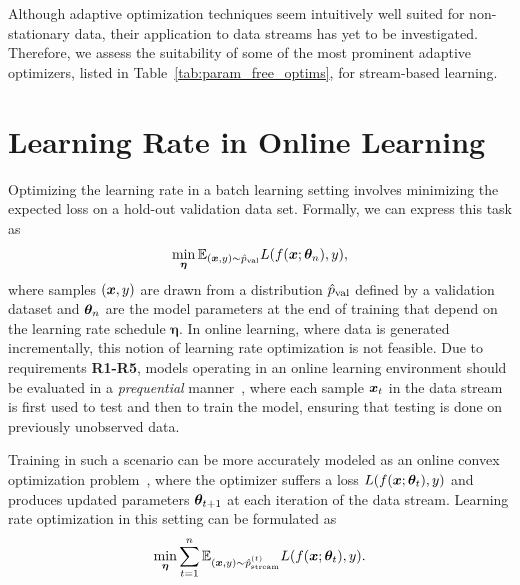 \documentclass{article} %
\begin{document}
Although adaptive optimization techniques seem intuitively well suited for non-stationary data, their application to data streams has yet to be investigated.
Therefore, we assess the suitability of some of the most prominent adaptive optimizers, listed in Table~\ref{tab:param_free_optims}, for stream-based learning.

\section{Learning Rate in Online Learning}\label{sec:lr_in_online_learning}

Optimizing the learning rate in a batch learning setting involves minimizing the expected loss on a hold-out validation data set.
Formally, we can express this task as
\begin{equation}
   \label{eq:batch_lr_optim}
   \min_{\bm{\eta}} \mathbb{E}_{({\bm{x}}, y) \sim \hat{p}_{\rm{val}}} L(f({\bm{x}}; {\bm{\theta}}_n), y),
\end{equation}
where samples $({\bm{x}}, y)$ are drawn from a distribution $\hat{p}_{\rm{val}}$ defined by a validation dataset and ${\bm{\theta}}_n$ are the model parameters at the end of training that depend on the learning rate schedule $\bm{\eta}$.
In online learning, where data is generated incrementally, this notion of learning rate optimization is not feasible.
Due to requirements \textbf{R1-R5}, models operating in an online learning environment should be evaluated in a \textit{prequential} manner~\citep{bifetMOAMassiveOnline2010}, where each sample ${\bm{x}}_t$ in the data stream is first used to test and then to train the model, ensuring that testing is done on previously unobserved data.

Training in such a scenario can be more accurately modeled as an online convex optimization problem~\citep{shalev-shwartzOnlineLearningOnline2011,hazanIntroductionOnlineConvex2016}, where the optimizer suffers a loss $L(f({\bm{x}}; {\bm{\theta}}_t), y)$ and produces updated parameters ${\bm{\theta}}_{t+1}$ at each iteration of the data stream.
Learning rate optimization in this setting can be formulated as
\begin{equation}
   \label{eq:stream_lr_optim}
   \min_{\bm{\eta}} \sum_{t=1}^{n} \mathbb{E}_{({\bm{x}}, y) \sim \hat{p}_{\rm{stream}}^{(t)}} L(f({\bm{x}}; {\bm{\theta}}_t), y).
\end{equation}
\end{document}
